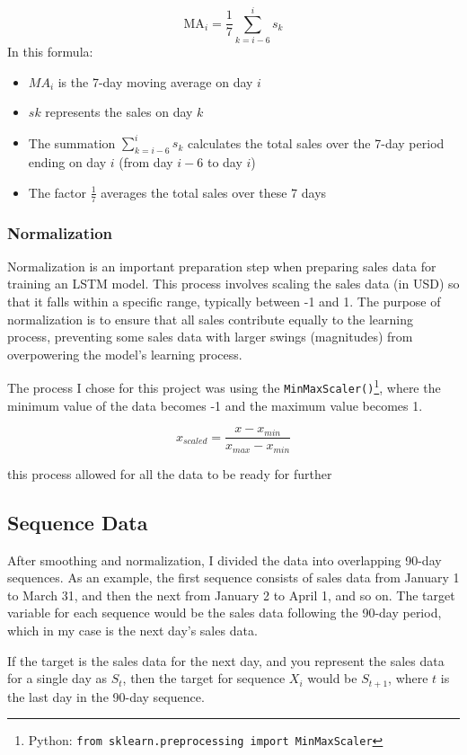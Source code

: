 \documentclass[10pt, journal, letterpaper, compsoc]{IEEEtran}
\begin{document}
$$
\text{MA}_i = \frac{1}{7} \sum_{k=i-6}^{i} s_k
$$
In this formula:
\begin{itemize}
    \item $MA_i$ is the 7-day moving average on day $i$
    \item $sk$ represents the sales on day $k$
    \item The summation $\sum_{k=i-6}^{i} s_k$ calculates the total sales over the 7-day period ending on day $i$ (from day $i-6$ to day $i$)
    \item The factor $\frac{1}{7}$ averages the total sales over these 7 days
\end{itemize}

\subsubsection{Normalization}
Normalization is an important preparation step when preparing sales data for training an LSTM model\cite{improved-sales-forecasting}. This process involves scaling the sales data (in USD) so that it falls within a specific range, typically between -1 and 1. The purpose of normalization is to ensure that all sales contribute equally to the learning process, preventing some sales data with larger swings (magnitudes) from overpowering the model's learning process.

The process I chose for this project was using the \texttt{MinMaxScaler()}\footnote{Python: \texttt{from sklearn.preprocessing import MinMaxScaler}}, where the minimum value of the data becomes \textsc{-1} and the maximum value becomes \textsc{1}.

$$
x_{scaled} = \frac{x-x_{min}}{x_{max}-x_{min}}
$$

this process allowed for all the data to be ready for further 

\subsection{Sequence Data}
After smoothing and normalization, I divided the data into overlapping 90-day sequences. As an example, the first sequence consists of sales data from January 1 to March 31, and then the next from January 2 to April 1, and so on. The target variable for each sequence would be the sales data following the 90-day period, which in my case is the next day's sales data.

If the target is the sales data for the next day, and you represent the sales data for a single day as $S_t$, then the target for sequence $X_i$ would be $S_{t+1}$, where $t$ is the last day in the 90-day sequence.
\end{document}
